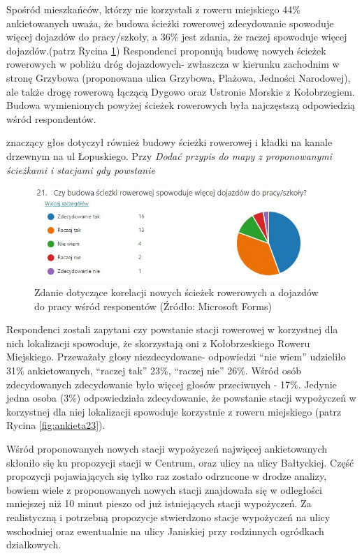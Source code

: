 \documentclass{amuthesis}
\begin{document}
Spośród mieszkańców, którzy nie korzystali z roweru miejskiego 44\% ankietowanych uważa, że budowa ścieżki rowerowej zdecydowanie spowoduje więcej dojazdów do pracy/szkoły, a 36\% jest zdania, że raczej spowoduje więcej dojazdów.(patrz Rycina \ref{fig:ankieta21})
Respondenci proponują budowę nowych ścieżek rowerowych w pobliżu dróg dojazdowych- zwłaszcza w kierunku zachodnim w stronę Grzybowa (proponowana ulica Grzybowa, Plażowa, Jedności Narodowej), ale także drogę rowerową łączącą Dygowo oraz Ustronie Morskie z Kołobrzegiem.
Budowa wymienionych powyżej ścieżek rowerowych była najczęstszą odpowiedzią wśród respondentów.

znaczący głos dotyczył również budowy ścieżki rowerowej i kładki na kanale drzewnym na ul Łopuskiego.
Przy \emph{Dodać przypis do mapy z proponowanymi ścieżkami i stacjami gdy powstanie}

\begin{figure}[t]

{\centering \includegraphics[width=400px]{figures/ankieta/21} 

}

\caption{Zdanie dotyczące korelacji nowych ścieżek rowerowych a dojazdów do pracy wśród responentów (Źródło: Microsoft Forms)}\label{fig:ankieta21}
\end{figure}

Respondenci zostali zapytani czy powstanie stacji rowerowej w korzystnej dla nich lokalizacji spowoduje, że skorzystają oni z Kołobrzeskiego Roweru Miejskiego.
Przeważały głosy niezdecydowane- odpowiedzi ``nie wiem'' udzieliło 31\% ankietowanych, ``raczej tak'' 23\%, ``raczej nie'' 26\%.
Wśród osób zdecydowanych zdecydowanie było więcej głosów przeciwnych - 17\%.
Jedynie jedna osoba (3\%) odpowiedziała zdecydowanie, że powstanie stacji wypożyczeń w korzystnej dla niej lokalizacji spowoduje korzystnie z roweru miejskiego (patrz Rycina \ref{fig:ankieta23}).

Wśród proponowanych nowych stacji wypożyczeń najwięcej ankietowanych skłoniło się ku propozycji stacji w Centrum, oraz ulicy na ulicy Bałtyckiej.
Część propozycji pojawiających się tylko raz zostało odrzucone w drodze analizy, bowiem wiele z proponowanych nowych stacji znajdowała się w odległości mniejszej niż 10 minut pieszo od już istniejących stacji wypożyczeń.
Za realistyczną i potrzebną propozycje stwierdzono stacje wypożyczeń na ulicy wschodniej oraz ewentualnie na ulicy Janiskiej przy rodzinnych ogródkach działkowych.
\end{document}
